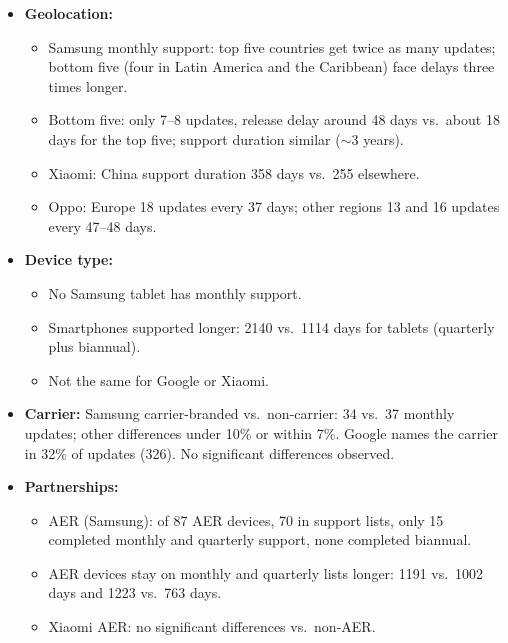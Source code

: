 \documentclass[11pt,a4paper]{article}
\begin{document}
\begin{enumerate}
\begin{itemize}[leftmargin=*,itemsep=1pt,topsep=2pt]
\begin{itemize}[itemsep=0pt]
            \item Average release delay: 25, 38, 57 days; up to 300 days for some models.
            \item Oppo: most devices received only three updates in quarterly support.
        \end{itemize}
        \item \textbf{Geolocation:}
        \begin{itemize}[itemsep=0pt]
            \item Samsung monthly support: top five countries get twice as many updates; bottom five (four in Latin America and the Caribbean) face delays three times longer.
            \item Bottom five: only 7--8 updates, release delay around 48 days vs.\ about 18 days for the top five; support duration similar ($\sim$3 years).
            \item Xiaomi: China support duration 358 days vs.\ 255 elsewhere.
            \item Oppo: Europe 18 updates every 37 days; other regions 13 and 16 updates every 47--48 days.
        \end{itemize}
        \item \textbf{Device type:}
        \begin{itemize}[itemsep=0pt]
            \item No Samsung tablet has monthly support.
            \item Smartphones supported longer: 2140 vs.\ 1114 days for tablets (quarterly plus biannual).
            \item Not the same for Google or Xiaomi.
        \end{itemize}
        \item \textbf{Carrier:} Samsung carrier-branded vs.\ non-carrier: 34 vs.\ 37 monthly updates; other differences under 10\% or within 7\%. Google names the carrier in 32\% of updates (326). No significant differences observed.
        \item \textbf{Partnerships:}
        \begin{itemize}[itemsep=0pt]
            \item AER (Samsung): of 87 AER devices, 70 in support lists, only 15 completed monthly and quarterly support, none completed biannual.
            \item AER devices stay on monthly and quarterly lists longer: 1191 vs.\ 1002 days and 1223 vs.\ 763 days.
            \item Xiaomi AER: no significant differences vs.\ non-AER.

\end{itemize}
\end{itemize}
\end{enumerate}
\end{document}

